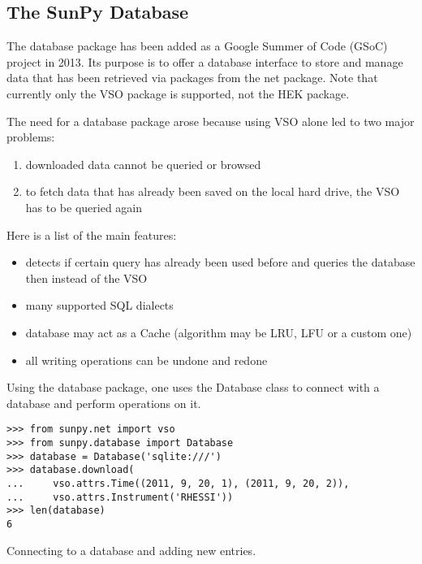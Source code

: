 \subsection{The SunPy Database}
The database package has been added as a Google Summer of Code (GSoC) project
in 2013. Its purpose is to offer a database interface to store and manage data
that has been retrieved via packages from the net package. Note that currently
only the VSO package is supported, not the HEK package.

The need for a database package arose because using VSO alone led to two major
problems:
\begin{enumerate}
  \item downloaded data cannot be queried or browsed
  \item to fetch data that has already been saved on the local hard drive,
    the VSO has to be queried again
\end{enumerate}

Here is a list of the main features:
\begin{itemize}
  \item detects if certain query has already been used before and queries
    the database then instead of the VSO
  \item many supported SQL dialects
  \item database may act as a Cache (algorithm may be LRU, LFU or a custom one)
  \item all writing operations can be undone and redone
\end{itemize}

Using the database package, one uses the Database class to connect with a
database and perform operations on it.

\begin{listing}
\begin{verbatim}
>>> from sunpy.net import vso
>>> from sunpy.database import Database
>>> database = Database('sqlite:///')
>>> database.download(
...     vso.attrs.Time((2011, 9, 20, 1), (2011, 9, 20, 2)),
...     vso.attrs.Instrument('RHESSI'))
>>> len(database)
6
\end{verbatim}
\caption{Connecting to a database and adding new entries.}
\label{code:db_1}
\end{listing}

